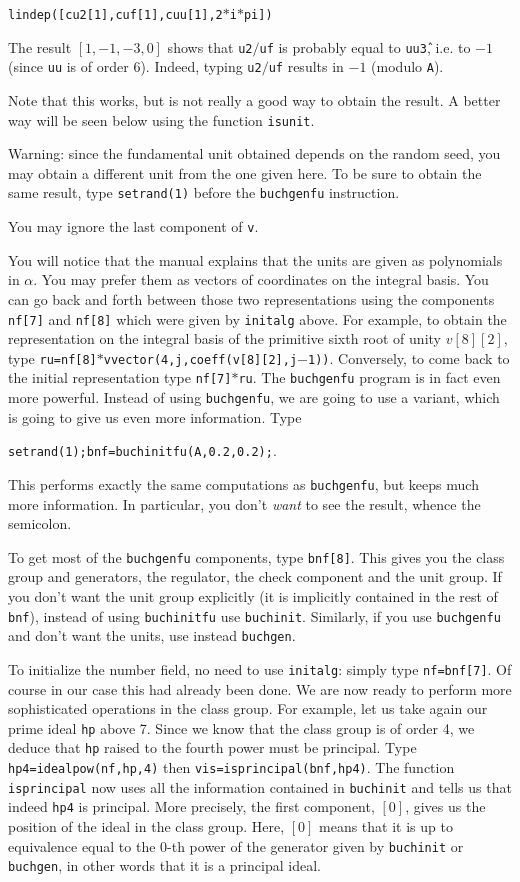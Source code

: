{\tt lindep([cu2[1],cuf[1],cuu[1],2$*$i$*$pi])} 

The result $[1,-1,-3,0]$ shows that {\tt u2$/$uf} is probably equal to 
{\tt uu\^{3}}, i.e. to $-1$ (since {\tt uu} is of order 6).
Indeed, typing {\tt u2$/$uf} results in {\tt $-1$} (modulo {\tt A}).

Note that this works, but is not really a good way to obtain the result.
A better way will be seen below using the function {\tt isunit}.

Warning: since the fundamental unit obtained depends on the
random seed, you may obtain a different unit from the one given here. To be
sure to obtain the same result, type {\tt setrand(1)} before the 
{\tt buchgenfu} instruction.

You may ignore the last component of {\tt v}.

You will notice that the manual explains that the units are given as 
polynomials in $\alpha$. You may prefer them as vectors of coordinates on
the integral basis. You can go back and forth between those two representations
using the components {\tt nf[7]} and {\tt nf[8]} which were given by
{\tt initalg} above. For example, to obtain the representation on the integral
basis of the primitive sixth root of unity $v[8][2]$, type
{\tt ru=nf[8]$*$vvector(4,j,coeff(v[8][2],j$-$1))}. Conversely, to come back to
the initial representation type {\tt nf[7]$*$ru}.
\smallskip
The {\tt buchgenfu} program is in fact even more powerful. Instead of using
{\tt buchgenfu}, we are going to use a variant, which is going to give us
even more information. Type 

{\tt setrand(1);bnf=buchinitfu(A,0.2,0.2);}.

This performs exactly the same computations as {\tt buchgenfu}, but keeps much
more information. In particular, you don't {\it want} to see the result, 
whence the semicolon.

To get most of the {\tt buchgenfu} components, type {\tt bnf[8]}. This gives
you the class group and generators, the regulator, the check component
and the unit group. If you don't want the unit group explicitly (it is 
implicitly contained in the rest of {\tt bnf}), instead of using
{\tt buchinitfu} use {\tt buchinit}. Similarly, if you use {\tt buchgenfu}
and don't want the units, use instead {\tt buchgen}.

To initialize the number field, no need to use {\tt initalg}: simply type
{\tt nf=bnf[7]}. Of course in our case this had already been done.
We are now ready to perform more sophisticated operations in the class group.
For example, let us take again our prime ideal {\tt hp} above 7. Since we
know that the class group is of order 4, we deduce that {\tt hp} raised to
the fourth power must be principal. Type {\tt hp4=idealpow(nf,hp,4)} then
{\tt vis=isprincipal(bnf,hp4)}. The function {\tt isprincipal} now uses all the
information contained in {\tt buchinit} and tells us that indeed {\tt hp4}
is principal. More precisely, the first component, $[0]$, gives us the position
of the ideal in the class group. Here, $[0]$ means that it is up to equivalence
equal to the 0-th power of the generator given by {\tt buchinit} or 
{\tt buchgen}, in other words that it is a principal ideal.

